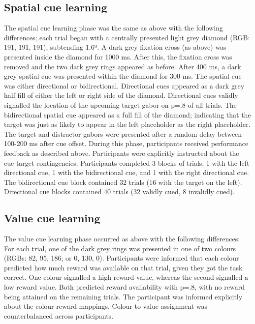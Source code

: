 \documentclass[11pt,halfline,a4paper,]{ouparticle}
\begin{document}
\hypertarget{spatial-cue-learning}{%
\subsection{Spatial cue learning}\label{spatial-cue-learning}}

The spatial cue learning phase was the same as above with the following differences; each trial began with a centrally presented light grey diamond (RGB: 191, 191, 191), subtending 1.6º. A dark grey fixation cross (as above) was presented inside the diamond for 1000 ms. After this, the fixation cross was removed and the two dark grey rings appeared as before. After 400 ms, a dark grey spatial cue was presented within the diamond for 300 ms. The spatial cue was either directional or bidirectional. Directional cues appeared as a dark grey half fill of either the left or right side of the diamond. Directional cues validly signalled the location of the upcoming target gabor on p=.8 of all trials. The bidirectional spatial cue appeared as a full fill of the diamond; indicating that the target was just as likely to appear in the left placeholder as the right placeholder. The target and distractor gabors were presented after a random delay between 100-200 ms after cue offset. During this phase, participants received performance feedback as described above. Participants were explicitly instructed about the cue-target contingencies. Participants completed 3 blocks of trials, 1 with the left directional cue, 1 with the bidirectional cue, and 1 with the right directional cue. The bidirectional cue block contained 32 trials (16 with the target on the left). Directional cue blocks contained 40 trials (32 validly cued, 8 invalidly cued).

\hypertarget{value-cue-learning}{%
\subsection{Value cue learning}\label{value-cue-learning}}

The value cue learning phase occurred as above with the following differences: For each trial, one of the dark grey rings was presented in one of two colours (RGBs: 82, 95, 186; or 0, 130, 0). Participants were informed that each colour predicted how much reward was available on that trial, given they got the task correct. One colour signalled a high reward value, whereas the second signalled a low reward value. Both predicted reward availability with p=.8, with no reward being attained on the remaining trials. The participant was informed explicitly about the colour reward mappings. Colour to value assignment was counterbalanced across participants.
\end{document}

